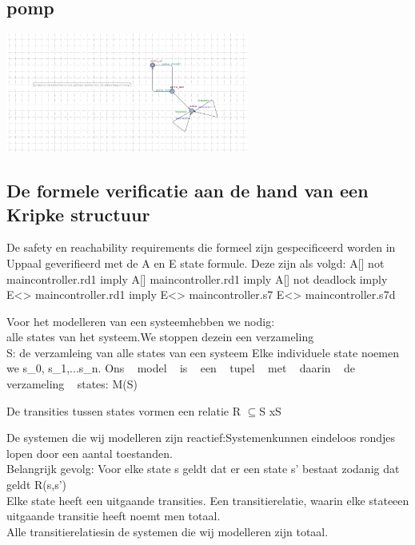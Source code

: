 \documentclass{article}
\begin{document}
	\subsection{pomp}	
	\includegraphics[width=8cm]{pomp.png} %
	
	 

	 
	
	
	

	
	\subsection{De formele verificatie aan de hand van een Kripke structuur}
	De safety en reachability requirements die formeel zijn gespecificeerd   worden in Uppaal geverifieerd met de A en E state formule. Deze zijn als volgd:
	A[] not maincontroller.rd1 imply
	A[] maincontroller.rd1 imply
	A[] not deadlock imply
	E<> maincontroller.rd1 imply
	E<> maincontroller.s7
	E<> maincontroller.s7d


 
 
 
 Voor het modelleren van een systeemhebben we nodig:\\
 alle states van het systeem.We stoppen dezein een verzameling \\
 S: de verzamleing van alle states van een systeem
 Elke individuele state noemen we s_{0}, s_{1},...s_{n}.
 Ons ~  model ~  is  ~ een  ~ tupel  ~ met ~  daarin ~  de  ~ verzameling  ~ states: M(S)
 
 
 De transities tussen states vormen een relatie
 R $\subseteq$S xS
 
 De systemen die wij modelleren zijn reactief:Systemenkunnen eindeloos rondjes lopen door een aantal toestanden. \\
 Belangrijk gevolg: Voor elke state s \inS geldt dat er een state s' bestaat zodanig dat geldt R(s,s') \\
 Elke state heeft een uitgaande transities.
 Een transitierelatie, waarin elke stateeen uitgaande transitie heeft noemt men totaal. \\
 Alle transitierelatiesin de  systemen die wij modelleren zijn totaal.
 
\end{document}
